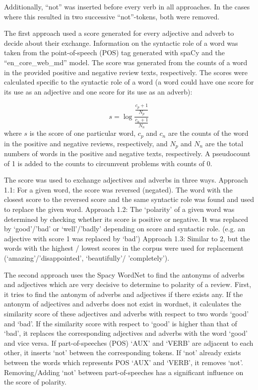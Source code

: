 \documentclass[11pt,a4paper]{article}
\begin{document}
Additionally, ``not'' was inserted before every verb in all approaches. In the cases where this resulted in two successive ``not''-tokens, both were removed.

The first approach used a score generated for every adjective and adverb to decide about their exchange. Information on the syntactic role of a word was taken from the point-of-speech (POS) tag generated with spaCy \cite{spacy2} and the ``en\_core\_web\_md'' model. The score was generated from the counts of a word in the provided positive and negative review texts, respectively. The scores were calculated specific to the syntactic role of a word (a word could have one score for its use as an adjective and one score for its use as an adverb):

\begin{equation}
s=\log\frac{\frac{c_p+1}{N_p}}{\frac{c_n+1}{N_n}}
\end{equation}
where $s$ is the score of one particular word, $c_p$  and $c_n$ are the counts of the word in the positive and negative reviews, respectively, and $N_p$ and $N_n$ are the total numbers of words in the positive and negative texts, respectively. A pseudocount of 1 is added to the counts to circumvent problems with counts of 0.

The score was used to exchange adjectives and adverbs in three ways. Approach 1.1: For a given word, the score was reversed (negated). The word with the closest score to the reversed score and the same syntactic role was found and used to replace the given word. Approach 1.2: The ‘polarity’ of a given word was determined by checking whether its score is positive or negative. It was replaced by ‘good’/’bad’ or ‘well’/’badly’ depending on score and syntactic role. (e.g. an adjective with score 1 was replaced by ‘bad’) Approach 1.3: Similar to 2, but the words with the highest / lowest scores in the corpus were used for replacement (‘amazing’/’disappointed’, ‘beautifully’/ ’completely’).

The second approach uses the Spacy WordNet \cite{miller1995wordnet} \cite{miller1998wordnet} to find the antonyms of adverbs and adjectives which are very decisive to determine to polarity of a review. First, it tries to find the antonym of adverbs and adjectives if there exists any. If the antonym of adjectives and adverbs does not exist in wordnet, it calculates the similarity score of these adjectives and adverbs with respect to two words ‘good’ and ‘bad’. If the similarity score with respect to ‘good’ is higher than that of ‘bad’, it replaces the corresponding adjectives and adverbs with the word ‘good’ and vice versa.
If part-of-speeches (POS) ‘AUX’ and ‘VERB’ are adjacent to each other, it inserts ‘not’ between the corresponding tokens. If ‘not’ already exists between the words which represents POS ‘AUX’ and ‘VERB’, it removes ‘not’. Removing/Adding ‘not’ between part-of-speeches has a significant influence on the score of polarity.
\end{document}
